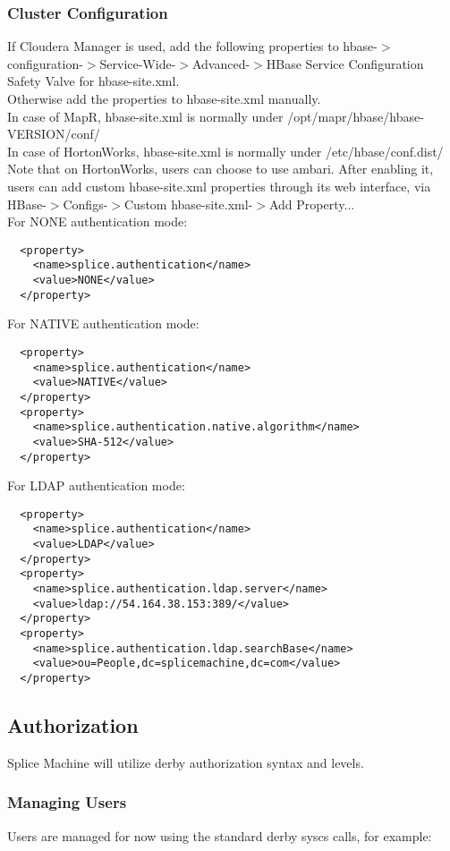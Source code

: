 \subsubsection{Cluster Configuration}
If Cloudera Manager is used, add the following properties to hbase-$>$configuration-$>$Service-Wide-$>$Advanced-$>$HBase Service Configuration Safety Valve for hbase-site.xml. \\
Otherwise add the properties to hbase-site.xml manually. \\
In case of MapR, hbase-site.xml is normally under /opt/mapr/hbase/hbase-VERSION/conf/ \\
In case of HortonWorks, hbase-site.xml is normally under /etc/hbase/conf.dist/ \\ 
Note that on HortonWorks, users can choose to use ambari. After enabling it, users can add custom hbase-site.xml properties through its web interface, via HBase-$>$Configs-$>$Custom hbase-site.xml-$>$Add Property...  \\ 
For NONE authentication mode:
\begin{lstlisting}
  <property> 
    <name>splice.authentication</name> 
    <value>NONE</value> 
  </property> 
\end{lstlisting}
For NATIVE authentication mode: 
\begin{lstlisting}
  <property> 
    <name>splice.authentication</name> 
    <value>NATIVE</value> 
  </property> 
  <property> 
    <name>splice.authentication.native.algorithm</name> 
    <value>SHA-512</value> 
  </property> 
\end{lstlisting} 
For LDAP authentication mode: 
\begin{lstlisting}
  <property> 
    <name>splice.authentication</name> 
    <value>LDAP</value> 
  </property> 
  <property> 
    <name>splice.authentication.ldap.server</name> 
    <value>ldap://54.164.38.153:389/</value> 
  </property> 
  <property> 
    <name>splice.authentication.ldap.searchBase</name> 
    <value>ou=People,dc=splicemachine,dc=com</value> 
  </property> 
\end{lstlisting}
 

\subsection{Authorization}
Splice Machine will utilize derby authorization syntax and levels. 

\subsubsection{Managing Users}
Users are managed for now using the standard derby syscs calls, for example:

